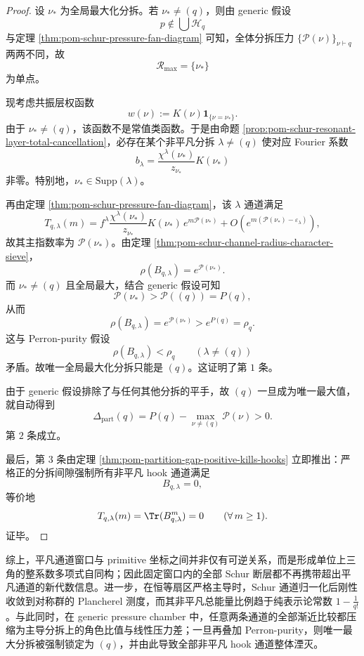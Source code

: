 \begin{proof}
设 \(\nu_*\) 为全局最大化分拆。若 \(\nu_*\neq(q)\)，则由 generic 假设
\[
p\notin\bigcup\mathcal H_q
\]
与定理 \ref{thm:pom-schur-pressure-fan-diagram} 可知，全体分拆压力 \(\{\mathcal P(\nu)\}_{\nu\vdash q}\) 两两不同，故
\[
\mathcal R_{\max}=\{\nu_*\}
\]
为单点。

现考虑共振层权函数
\[
w(\nu):=K(\nu)\mathbf 1_{\{\nu=\nu_*\}}.
\]
由于 \(\nu_*\neq(q)\)，该函数不是常值类函数。于是由命题 \ref{prop:pom-schur-resonant-layer-total-cancellation}，必存在某个非平凡分拆 \(\lambda\neq(q)\) 使对应 Fourier 系数
\[
b_\lambda=
\frac{\chi^\lambda(\nu_*)}{z_{\nu_*}}K(\nu_*)
\]
非零。特别地，\(\nu_*\in\mathrm{Supp}(\lambda)\)。

再由定理 \ref{thm:pom-schur-pressure-fan-diagram}，该 \(\lambda\) 通道满足
\[
T_{q,\lambda}(m)
=
f^\lambda\frac{\chi^\lambda(\nu_*)}{z_{\nu_*}}K(\nu_*)\,e^{m\mathcal P(\nu_*)}
+O\!\left(e^{m(\mathcal P(\nu_*)-\varepsilon_\lambda)}\right),
\]
故其主指数率为 \(\mathcal P(\nu_*)\)。由定理
\ref{thm:pom-schur-channel-radius-character-sieve}，
\[
\rho(B_{q,\lambda})=e^{\mathcal P(\nu_*)}.
\]
而 \(\nu_*\neq(q)\) 且全局最大，结合 generic 假设可知
\[
\mathcal P(\nu_*)>\mathcal P((q))=P(q),
\]
从而
\[
\rho(B_{q,\lambda})=e^{\mathcal P(\nu_*)}>e^{P(q)}=\rho_q.
\]
这与 Perron-purity 假设
\[
\rho(B_{q,\lambda})<\rho_q\qquad(\lambda\neq(q))
\]
矛盾。故唯一全局最大化分拆只能是 \((q)\)。这证明了第 \(1\) 条。

由于 generic 假设排除了与任何其他分拆的平手，故 \((q)\) 一旦成为唯一最大值，就自动得到
\[
\Delta_{\mathrm{part}}(q)=P(q)-\max_{\nu\neq(q)}\mathcal P(\nu)>0.
\]
第 \(2\) 条成立。

最后，第 \(3\) 条由定理 \ref{thm:pom-partition-gap-positive-kills-hooks} 立即推出：严格正的分拆间隙强制所有非平凡 hook 通道满足
\[
B_{q,\lambda}=0,
\]
等价地
\[
T_{q,\lambda}(m)=\Tr(B_{q,\lambda}^m)=0
\qquad(\forall\,m\ge 1).
\]
证毕。
\end{proof}

\noindent
综上，平凡通道窗口与 primitive 坐标之间并非仅有可逆关系，而是形成单位上三角的整系数多项式自同构；因此固定窗口内的全部 Schur 断层都不再携带超出平凡通道的新代数信息。进一步，在恒等扇区严格主导时，Schur 通道归一化后刚性收敛到对称群的 Plancherel 测度，而其非平凡总能量比例趋于纯表示论常数 \(1-\frac{1}{q!}\)。与此同时，在 generic pressure chamber 中，任意两条通道的全部渐近比较都压缩为主导分拆上的角色比值与线性压力差；一旦再叠加 Perron-purity，则唯一最大分拆被强制锁定为 \((q)\)，并由此导致全部非平凡 hook 通道整体湮灭。

\endinput
